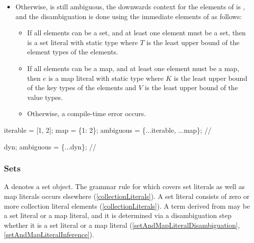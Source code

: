 \documentclass[makeidx]{article}
\begin{document}
{\begin{itemize}
  The static type of  is then .
\item
  Otherwise,  is still ambiguous,
  the downwards context for the elements of 
  is \FreeContext,
  and the disambiguation is done using
  the immediate elements of  as follows:

  \begin{itemize}
  \item
    If all elements can be a set,
    and at least one element must be a set,
    then  is a set literal with
    static type  where $T$ is
    the least upper bound of the element types of the elements.
  \item
    If all elements can be a map,
    and at least one element must be a map, then $e$ is
    a map literal with static type  where $K$ is
    the least upper bound of the key types of the elements and $V$ is
    the least upper bound of the value types.
  \item
    Otherwise, a compile-time error occurs.
  \end{itemize}
\end{itemize}


\begin{dartCode}
\VAR{} iterable = [1, 2];
\VAR{} map = \{1: 2\};
\VAR{} ambiguous = \{...iterable, ...map\}; // 
\end{dartCode}

\noindent
{}

\begin{dartCode}
\DYNAMIC{} dyn;
\VAR{} ambiguous = \{...dyn\}; // 
\end{dartCode}


\subsubsection{Sets}

\LMHash{}%
A  denotes a set object.
The grammar rule for  which covers
set literals as well as map literals occurs elsewhere
(\ref{collectionLiterals}).
A set literal consists of zero or more collection literal elements
(\ref{collectionLiterals}).
A term derived from 
may be a set literal or a map literal,
and it is determined via a disambiguation step
whether it is a set literal or a map literal
(\ref{setAndMapLiteralDisambiguation}, \ref{setAndMapLiteralInference}).

}
\end{document}
